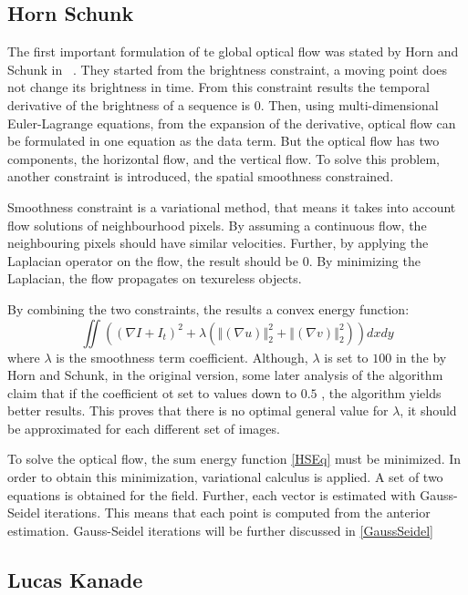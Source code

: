 \documentclass[12pt,a4paper,twoside]{report}
\begin{document}
\subsection{Horn Schunk}
The first important formulation of te global optical flow was stated by Horn and Schunk in ~\cite{HSOpticalFlow}. They started from the brightness constraint, a moving point does not change its brightness in time. From this constraint results the temporal derivative of the brightness of a sequence is $0$. Then,  using multi-dimensional Euler-Lagrange equations, from the expansion of the derivative, optical flow  can be formulated in one equation as the data term. But the optical flow has two components, the horizontal flow, and the vertical flow. To solve this problem, another constraint is introduced, the spatial smoothness constrained. 

Smoothness constraint is a variational method, that means it takes into account flow solutions of neighbourhood pixels. By assuming a continuous flow, the neighbouring pixels should have similar velocities\cite{HSOpticalFlow}. Further, by applying the Laplacian operator on the flow, the result should be 0. By minimizing the Laplacian, the flow propagates on texureless objects.

By combining the two constraints, the results a convex energy function:
\begin{equation} \label{HSEq}
	\iint  ((\nabla I + I_t)^2 + \lambda(\left\Vert(\nabla u) \right\Vert_2^2 +\left\Vert(\nabla v) \right\Vert_2^2))dxdy
\end{equation}
where $\lambda$ is the smoothness term coefficient. Although, $\lambda$ is set to $100$ in the by Horn and Schunk, in the original version, some later analysis of the algorithm claim that if the coefficient ot set to values down to $0.5$ \cite{barron1994}, the algorithm yields better results. This proves that there is no optimal general value for $\lambda$, it should be approximated for each different set of images.

To solve the optical flow, the sum energy function \ref{HSEq} must be minimized. In order to obtain this minimization, variational calculus is applied. A set of two equations is obtained for the field.
Further, each vector is estimated with Gauss-Seidel iterations. This means that each point is computed from the anterior estimation. Gauss-Seidel iterations will be further discussed in \ref{GaussSeidel}


\subsection{Lucas Kanade}
\end{document}

